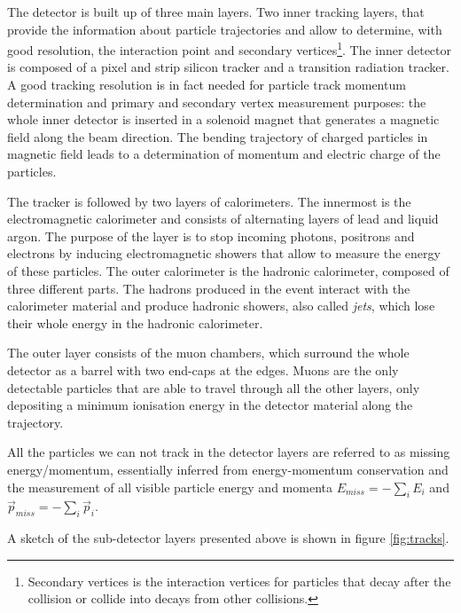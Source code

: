 The detector is built up of three main layers. Two inner tracking layers, that provide the information about particle trajectories and allow to determine, with good resolution, the interaction point and secondary vertices\footnote{Secondary vertices is the interaction vertices for particles that decay after the collision or collide into decays from other collisions.}. The inner detector is composed of a pixel and strip silicon tracker and a transition radiation tracker. A good tracking resolution is in fact needed for particle track momentum determination and primary and secondary vertex measurement purposes: the whole inner detector is inserted in a solenoid magnet that generates a magnetic field along the beam direction. The bending trajectory of charged particles in magnetic field leads to a determination of momentum and electric charge of the particles.

The tracker is followed by two layers of calorimeters. The innermost is the electromagnetic calorimeter and consists of alternating layers of lead and liquid argon. The purpose of the layer is to stop incoming photons, positrons and electrons by inducing electromagnetic showers that allow to measure the energy of these particles. The outer calorimeter is the hadronic calorimeter, composed of three different parts. The hadrons produced in the event interact with the calorimeter material and produce hadronic showers, also called \textit{jets}, which lose their whole energy in the hadronic calorimeter. 

The outer layer consists of the muon chambers, which surround the whole detector as a barrel with two end-caps at the edges. Muons are the only detectable particles that are able to travel through all the other layers, only depositing a minimum ionisation energy in the detector material along the trajectory. 

All the particles we can not track in the detector layers are referred to as missing energy/momentum, essentially inferred from energy-momentum conservation and the measurement of all visible particle energy and momenta $E_{miss} = -\sum_i E_i$ and $\Vec{p}_{miss} = -\sum_i \Vec{p}_i$. 

A sketch of the sub-detector layers presented above is shown in figure \ref{fig:tracks}.

